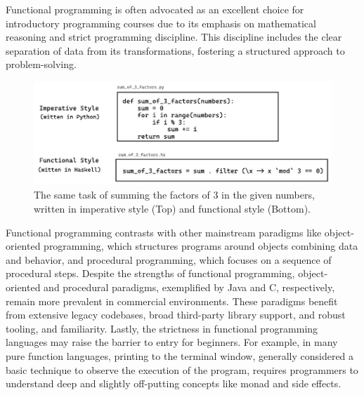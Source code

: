 Functional programming is often advocated as an excellent choice for introductory programming courses due to its emphasis on mathematical reasoning and strict programming discipline. This discipline includes the clear separation of data from its transformations, fostering a structured approach to problem-solving.


\begin{figure}[hbt]
  \includegraphics[width=\linewidth]{ImperativeFunctional}
  \caption{
    \label{fig:imperative-vs-functional}
   The same task of summing the factors of 3 in the given numbers, written in imperative style (Top) and functional style (Bottom).
    }
\end{figure}


Functional programming contrasts with other mainstream paradigms like object-oriented programming, which structures programs around objects combining data and behavior, and procedural programming, which focuses on a sequence of procedural steps. Despite the strengths of functional programming, object-oriented and procedural paradigms, exemplified by Java and C, respectively, remain more prevalent in commercial environments. These paradigms benefit from extensive legacy codebases, broad third-party library support, and robust tooling, and familiarity. Lastly, the strictness in functional programming languages may raise the barrier to entry for beginners. For example, in many pure function languages, printing to the terminal window, generally considered a basic technique to observe the execution of the program, requires programmers to understand deep and slightly off-putting concepts like monad and side effects.  


